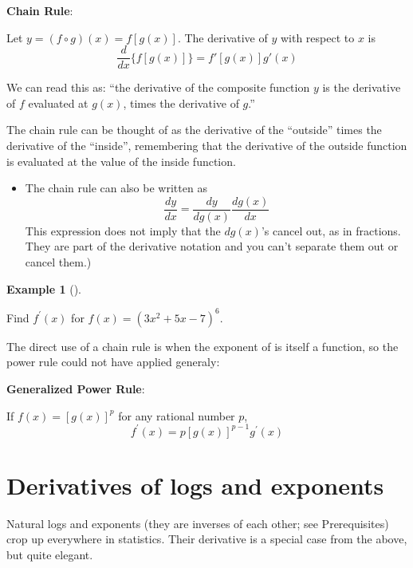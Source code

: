 \documentclass[
  letterpaper,
]{book}
\providecommand{\tightlist}{%
  \setlength{\itemsep}{0pt}\setlength{\parskip}{0pt}}\usepackage{longtable,booktabs,array}
\theoremstyle{definition}
\theoremstyle{definition}
\newtheorem{example}{Example}[chapter]
\theoremstyle{plain}
\theoremstyle{definition}
\theoremstyle{plain}
\theoremstyle{plain}
\theoremstyle{remark}
\begin{document}
\textbf{Chain Rule}:

Let \(y=(f\circ g)(x)= f[g(x)]\). The derivative of \(y\) with respect
to \(x\) is \[\frac{d}{dx} \{ f[g(x)] \} = f'[g(x)] g'(x)\]

We can read this as: ``the derivative of the composite function \(y\) is
the derivative of \(f\) evaluated at \(g(x)\), times the derivative of
\(g\).''

The chain rule can be thought of as the derivative of the ``outside''
times the derivative of the ``inside'', remembering that the derivative
of the outside function is evaluated at the value of the inside
function.

\begin{itemize}
\tightlist
\item
  The chain rule can also be written as
  \[\frac{dy}{dx}=\frac{dy}{dg(x)} \frac{dg(x)}{dx}\] This expression
  does not imply that the \(dg(x)\)'s cancel out, as in fractions. They
  are part of the derivative notation and you can't separate them out or
  cancel them.)
\end{itemize}

\leavevmode{}%
\begin{example}[]\label{exm-tothesix}

Find \(f^\prime(x)\) for \(f(x) = (3x^2+5x-7)^6\).

\end{example}

The direct use of a chain rule is when the exponent of is itself a
function, so the power rule could not have applied generaly:

\textbf{Generalized Power Rule}:

If \(f(x)=[g(x)]^p\) for any rational number \(p\),
\[f^\prime(x) =p[g(x)]^{p-1}g^\prime(x)\]

\hypertarget{derivatives-of-logs-and-exponents}{%
\section{Derivatives of logs and
exponents}\label{derivatives-of-logs-and-exponents}}

Natural logs and exponents (they are inverses of each other; see
Prerequisites) crop up everywhere in statistics. Their derivative is a
special case from the above, but quite elegant.
\end{document}
